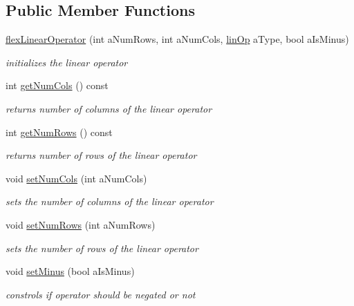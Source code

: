 \subsection*{Public Member Functions}
\begin{DoxyCompactItemize}
\item 
\hyperlink{classflex_linear_operator_ab4a525e1069965d018b8f4371db60234}{flex\+Linear\+Operator} (int a\+Num\+Rows, int a\+Num\+Cols, \hyperlink{tools_8h_a3fc67a2f9370c09fecbd90da67687d36}{lin\+Op} a\+Type, bool a\+Is\+Minus)
\begin{DoxyCompactList}\small\item\em initializes the linear operator \end{DoxyCompactList}\item 
int \hyperlink{classflex_linear_operator_add18da4274ec9105f7ba8852be35201a}{get\+Num\+Cols} () const
\begin{DoxyCompactList}\small\item\em returns number of columns of the linear operator \end{DoxyCompactList}\item 
int \hyperlink{classflex_linear_operator_a6f807b6a0549a79cb22598ab0c42ef21}{get\+Num\+Rows} () const
\begin{DoxyCompactList}\small\item\em returns number of rows of the linear operator \end{DoxyCompactList}\item 
void \hyperlink{classflex_linear_operator_add43d72e6e24ff2690fc3f1ea2578818}{set\+Num\+Cols} (int a\+Num\+Cols)
\begin{DoxyCompactList}\small\item\em sets the number of columns of the linear operator \end{DoxyCompactList}\item 
void \hyperlink{classflex_linear_operator_a14ea80aaa2a6d3c468f6bf38452f1001}{set\+Num\+Rows} (int a\+Num\+Rows)
\begin{DoxyCompactList}\small\item\em sets the number of rows of the linear operator \end{DoxyCompactList}\item 
void \hyperlink{classflex_linear_operator_a0757a5f739ef85162cfc95e40eeb7784}{set\+Minus} (bool a\+Is\+Minus)
\begin{DoxyCompactList}\small\item\em constrols if operator should be negated or not \end{DoxyCompactList}\item 

\end{DoxyCompactItemize}
